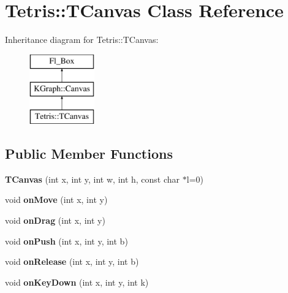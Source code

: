 \hypertarget{class_tetris_1_1_t_canvas}{\section{Tetris\-:\-:T\-Canvas Class Reference}
\label{class_tetris_1_1_t_canvas}
}
Inheritance diagram for Tetris\-:\-:T\-Canvas\-:\begin{figure}[H]
\begin{center}
\leavevmode
\includegraphics[height=3.000000cm]{class_tetris_1_1_t_canvas}
\end{center}
\end{figure}
\subsection*{Public Member Functions}
\begin{DoxyCompactItemize}
\item 
\hypertarget{class_tetris_1_1_t_canvas_a90791be4bc594cb4892caae0a52648f9}{{\bfseries T\-Canvas} (int x, int y, int w, int h, const char $\ast$l=0)}\label{class_tetris_1_1_t_canvas_a90791be4bc594cb4892caae0a52648f9}

\item 
\hypertarget{class_tetris_1_1_t_canvas_a8b19b8162a434620547de8afb101fc5c}{void {\bfseries on\-Move} (int x, int y)}\label{class_tetris_1_1_t_canvas_a8b19b8162a434620547de8afb101fc5c}

\item 
\hypertarget{class_tetris_1_1_t_canvas_ac43081f6deb9437ebe044cf98e2e6e58}{void {\bfseries on\-Drag} (int x, int y)}\label{class_tetris_1_1_t_canvas_ac43081f6deb9437ebe044cf98e2e6e58}

\item 
\hypertarget{class_tetris_1_1_t_canvas_a5dec34dba9268c77f2fbb2b2ec5df5ad}{void {\bfseries on\-Push} (int x, int y, int b)}\label{class_tetris_1_1_t_canvas_a5dec34dba9268c77f2fbb2b2ec5df5ad}

\item 
\hypertarget{class_tetris_1_1_t_canvas_ad16d10216c737def213b1abe66ab8865}{void {\bfseries on\-Release} (int x, int y, int b)}\label{class_tetris_1_1_t_canvas_ad16d10216c737def213b1abe66ab8865}

\item 
\hypertarget{class_tetris_1_1_t_canvas_a0f4b7e7d02b6168bfd3b25f4afb35eaa}{void {\bfseries on\-Key\-Down} (int x, int y, int k)}\label{class_tetris_1_1_t_canvas_a0f4b7e7d02b6168bfd3b25f4afb35eaa}

\end{DoxyCompactItemize}
